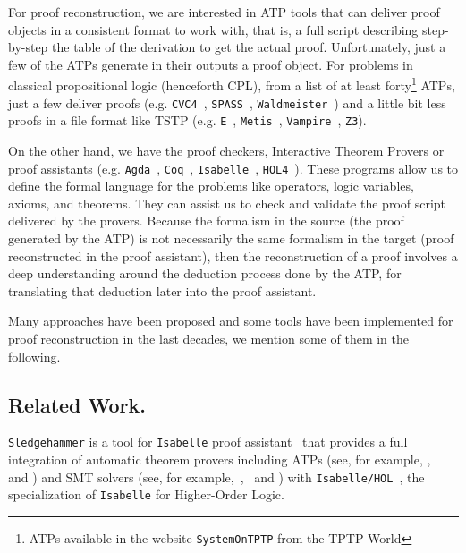 \documentclass[runningheads,a4paper]{llncs}
\begin{document}
For proof reconstruction, we are interested in ATP tools that can deliver proof
objects in a consistent format to work with, that is, a full script describing
step-by-step the table of the derivation to get the actual proof. Unfortunately,
just a few of the ATPs generate in their outputs a proof object. For problems in classical propositional logic (henceforth CPL), from a list of
at least forty\footnote{ATPs available in the website  \texttt{SystemOnTPTP}
  from the TPTP World} ATPs, just a few deliver proofs (e.g.
\verb!CVC4!~\cite{Barrett2011}, \verb!SPASS!~\cite{Weidenbach2009},
\verb!Waldmeister!~\cite{hillenbrand1997}) and a little bit less proofs in a file
format like TSTP (e.g. \verb!E!~\cite{Schulz:AICOM-2002}, \verb!Metis!~\cite{hurd2003first}, \verb!Vampire!~\cite{Riazanov1999}, \verb!Z3!).

On the other hand, we have the proof checkers, Interactive Theorem Provers
or proof assistants (e.g. \verb!Agda!~\cite{agdateam}, \verb!Coq!~\cite{coqteam}, \verb!Isabelle!~\cite{paulson1994isabelle}, \verb!HOL4!~\cite{norrish2007hol}). These programs allow us to define the formal language for the problems like operators, logic variables, axioms, and theorems. They can assist us to check and validate the proof script delivered by the provers. Because the formalism in the source (the proof generated by the ATP) is not necessarily the same formalism in the target (proof reconstructed in the proof assistant), then the reconstruction of a proof involves a deep understanding around the deduction process done by the ATP, for translating that deduction later into the proof assistant.

Many approaches have been proposed and some tools have been implemented for proof reconstruction in the last decades, we mention some of them in the following.

\subsection*{Related Work.}\label{Related Work}
\par
\verb!Sledgehammer! is a tool for \verb!Isabelle! proof
assistant~\cite{paulson1994isabelle} that provides a full integration of
automatic theorem provers including ATPs (see, for example,
\cite{meng2006automation}, ~\cite{blanchette2013extending} and \cite{Fleury2014}) and SMT solvers (see, for
example,~\cite{blanchette2013extending},~\cite{bohme2010} and \cite{Fleury2014}) with \verb!Isabelle/HOL!~\cite{nipkow2002isabelle}, the specialization of \verb!Isabelle! for Higher-Order Logic.
\end{document}
